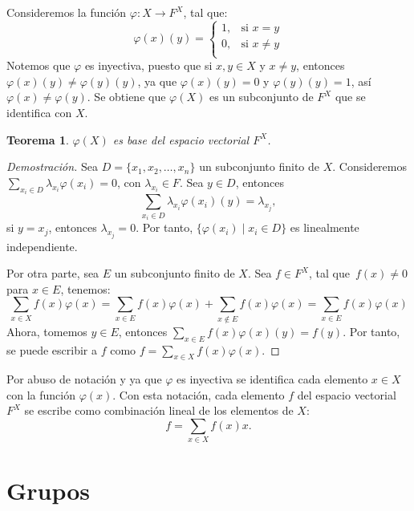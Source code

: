 \documentclass[12pt]{book}
\newtheorem{theorem}{Teorema}[section]
\theoremstyle{definition}
\newtheorem{definition}[theorem]{Definición}
\newcounter{in}
\newcounter{ini}
\begin{document}
  Consideremos la función $\varphi:X\rightarrow F^{X}$, tal que:
  \[
  \varphi(x)(y)=
  \begin{cases}
    1, & \text{si } x=y \\
    0, & \text{si } x\neq y \\
  \end{cases}
  \]
Notemos que $\varphi$ es inyectiva, puesto que si $x,y\in X$ y $x\neq y$,
entonces $\varphi(x)(y)\neq\varphi(y)(y)$, ya que
$\varphi(x)(y)=0$ y $\varphi(y)(y)=1$, así
$\varphi(x)\neq\varphi(y)$. Se obtiene que $\varphi(X)$ es un subconjunto de $F^{X}$ que
se identifica con $X$.
\begin{theorem}
  \label{base-FX}
  $\varphi(X)$ es base del espacio vectorial $F^{X}$.
\end{theorem}
\begin{proof}[Demostración]
  Sea $D=\{x_{1},x_{2},\dots,x_{n}\}$ un subconjunto finito de $X$. Consideremos
  $\sum_{x_{i}\in D} \lambda_{x_{i}}\varphi(x_{i})=0$, con
  $\lambda_{x_{i}}\in F$. Sea $y\in D$, entonces
  $$\sum_{x_{i}\in D} \lambda_{x_{i}}\varphi(x_{i})(y)=\lambda_{x_{j}},$$
  si $y=x_{j}$, entonces $\lambda_{x_{j}}=0$. Por tanto, $\{\varphi(x_{i})\mid x_{i}\in D\}$ es linealmente independiente.

  Por otra parte, sea $E$ un subconjunto finito de $X$. Sea $f\in F^{X}$, tal que~$f(x)\neq 0$ para $x\in E$, tenemos:
  $$\sum_{x\in X}f(x)\varphi(x)=\sum_{x\in
    E}f(x)\varphi(x)+\sum_{x\not\in E}f(x)\varphi(x)=\sum_{x\in E}f(x)\varphi(x)$$
  Ahora, tomemos $y\in E$, entonces $\sum_{x\in
    E}f(x)\varphi(x)(y)=f(y)$. Por tanto, se puede escribir a $f$ como $f=\sum_{x\in X}f(x)\varphi(x)$. 
\end{proof}

Por abuso de notación y ya que $\varphi$ es inyectiva se
identifica cada elemento $x\in X$ con la función
$\varphi(x)$. Con esta notación, cada elemento $f$ del espacio vectorial
$F^{X}$ se escribe como combinación lineal de los elementos de $X$:
\begin{equation}
  \label{sumas-formales}
  f=\sum_{x\in X} f(x)x.
\end{equation}

\section{Grupos}
\label{grupos}
\end{document}
